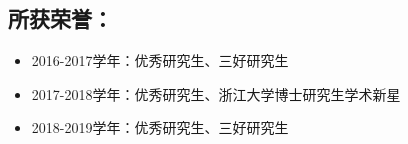 \begin{publications}
\section*{所获荣誉：}

\begin{itemize}
    
\item 2016-2017学年：优秀研究生、三好研究生

\item 2017-2018学年：优秀研究生、浙江大学博士研究生学术新星

\item 2018-2019学年：优秀研究生、三好研究生

\end{itemize}

\end{publications}
